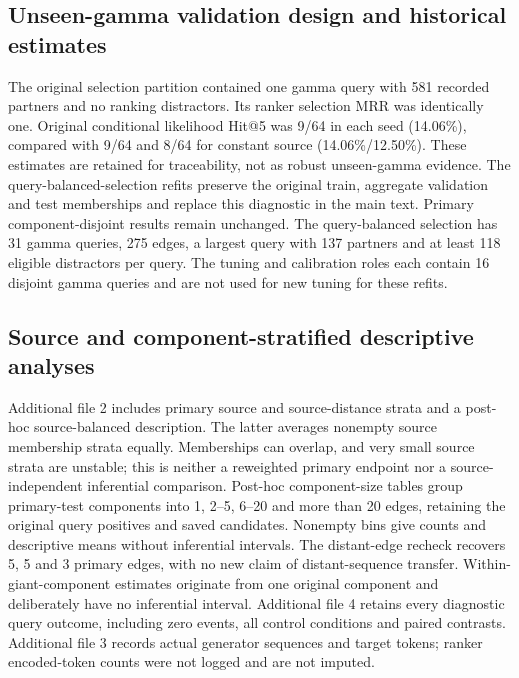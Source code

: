 \documentclass[a4paper,11pt]{article}
\begin{document}
\subsection{Unseen-gamma validation design and historical estimates}
\label{sec:historical}
The original selection partition contained one gamma query with 581 recorded
partners and no ranking distractors. Its ranker selection MRR was identically
one. Original conditional likelihood Hit@5 was 9/64 in each seed (14.06\%),
compared with 9/64 and 8/64 for constant source (14.06\%/12.50\%). These
estimates are retained for traceability, not as robust unseen-gamma evidence.
The query-balanced-selection refits preserve the original train, aggregate validation
and test memberships and replace this diagnostic in the main text. Primary
component-disjoint results remain unchanged. The query-balanced selection has 31
gamma queries, 275 edges, a largest query with 137 partners and at least 118
eligible distractors per query. The tuning and calibration roles each contain
16 disjoint gamma queries and are not used for new tuning for these refits.

\subsection{Source and component-stratified descriptive analyses}
Additional file 2 includes primary source and source-distance strata and a
post-hoc source-balanced description. The latter averages nonempty source
membership strata equally. Memberships can overlap, and very small source
strata are unstable; this is neither a reweighted primary endpoint nor a
source-independent inferential comparison. Post-hoc component-size tables group
primary-test components into 1, 2--5, 6--20 and more than 20 edges, retaining
the original query positives and saved candidates. Nonempty bins give counts
and descriptive means without inferential intervals. The distant-edge recheck recovers
5, 5 and 3 primary edges, with no new claim of distant-sequence transfer.
Within-giant-component estimates originate from one original component and
deliberately have no inferential interval. Additional file 4 retains every
diagnostic query outcome, including zero events, all control conditions and
paired contrasts. Additional file 3 records actual generator sequences and
target tokens; ranker encoded-token counts were not logged and are not imputed.
\end{document}
